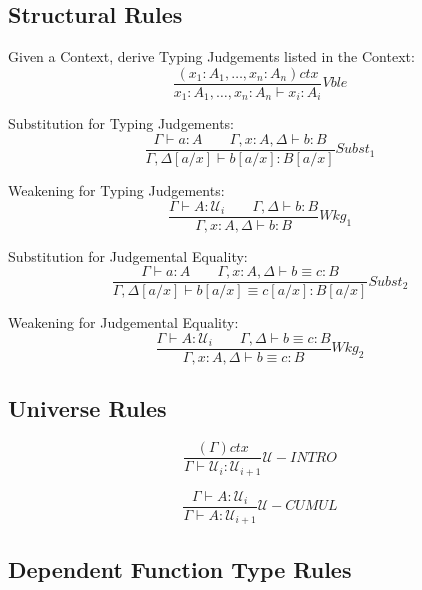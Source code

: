 \documentclass{article}
\begin{document}
\subsection{Structural Rules}

Given a Context, derive Typing Judgements listed in the Context:
\[
    {
        \frac
        {(x_1:A_1, \ldots, x_n:A_n)ctx}
        {x_1:A_1, \ldots, x_n:A_n \vdash x_i:A_i}
    } Vble
\]

Substitution for Typing Judgements:
\[
    {
        \frac
        {\Gamma \vdash a : A \;\;\;\;\;\;\;
        \Gamma,x:A,\Delta \vdash b : B}
        {\Gamma,\Delta[a/x] \vdash b[a/x] : B[a/x]}
    } Subst_1
\]

Weakening for Typing Judgements:
\[
    {
        \frac
        {\Gamma \vdash A : \mathcal{U}_i \;\;\;\;\;\;\;
        \Gamma,\Delta \vdash b : B}
        {\Gamma,x:A,\Delta \vdash b:B}
    } Wkg_1
\]

Substitution for Judgemental Equality:
\[
    {
        \frac
        {\Gamma \vdash a : A \;\;\;\;\;\;\;
        \Gamma,x:A,\Delta \vdash b \equiv c : B}
        {\Gamma,\Delta[a/x] \vdash b[a/x] \equiv c[a/x] : B[a/x]}
    } Subst_2
\]

Weakening for Judgemental Equality:
\[
    {
        \frac
        {\Gamma \vdash A : \mathcal{U}_i \;\;\;\;\;\;\;
        \Gamma,\Delta \vdash b \equiv c : B}
        {\Gamma, x:A, \Delta \vdash b \equiv c : B}
    } Wkg_2
\]



\subsection{Universe Rules}\label{subsec:universe_rules}

\[
    {
        \frac
        {(\Gamma) ctx}
        {\Gamma \vdash \mathcal{U}_i : \mathcal{U}_{i+1}}
    } \mathcal{U}-INTRO
\]

\[
    {
        \frac
        {\Gamma \vdash A : \mathcal{U}_i}
        {\Gamma \vdash A : \mathcal{U}_{i+1}}
    } \mathcal{U}-CUMUL
\]



\subsection{Dependent Function Type Rules}\label{subsec:dependent_rules}
\end{document}
